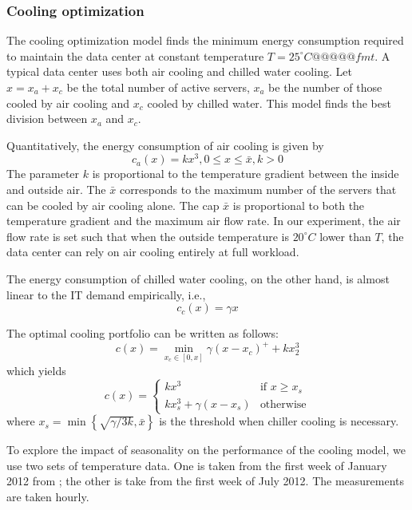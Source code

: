 \documentclass{acm_proc_article-sp}
\begin{document}
\subsubsection{Cooling optimization}
The cooling optimization model finds the minimum energy consumption required to maintain the data center at constant temperature $T = 25^{\circ}C@@@@@fmt$. A typical data center uses both air cooling and chilled water cooling. Let $x = x_a + x_c$ be the total number of active servers, $x_a$ be the number of those cooled by air cooling and $x_c$ cooled by chilled water. This model finds the best division between $x_a$ and $x_c$. 

Quantitatively, the energy consumption of air cooling is given by 
\begin{equation}
c_a(x) = kx^3, 0 \leq x \leq \bar{x}, k > 0
\end{equation}
The parameter $k$ is proportional to the temperature gradient between the inside and outside air. The $\bar{x}$ corresponds to the maximum number of the servers that can be cooled by air cooling alone. The cap $\bar{x}$ is proportional to both the temperature gradient and the maximum air flow rate. In our experiment, the air flow rate is set such that when the outside temperature is $20^{\circ}C$ lower than $T$, the data center can rely on air cooling entirely at full workload.

The energy consumption of chilled water cooling, on the other hand, is almost linear to the IT demand empirically, i.e.,
\begin{equation}
c_c(x) = \gamma x
\end{equation}

The optimal cooling portfolio can be written as follows:
\begin{equation}
c(x) =  \min_{x_c \in [0,x]} \gamma(x-x_c)^+ + kx_2^3
\end{equation}
which yields
$$
c(x) = \left\{ \begin{array}{ll}
         kx^3 & \mbox{if $x \geq x_s$}\\
        kx_s^3 + \gamma (x-x_s) & \mbox{otherwise}\end{array} \right.
$$
where $x_s = \min \left\{\sqrt{\gamma/3k}, \bar{x}\right\}$ is the threshold when chiller cooling is necessary.

To explore the impact of seasonality on the performance of the cooling model, we use two sets of temperature data. One is taken from the first week of January 2012 from \cite{temp}; the other is take from the first week of July 2012. The measurements are taken hourly.
\end{document}
